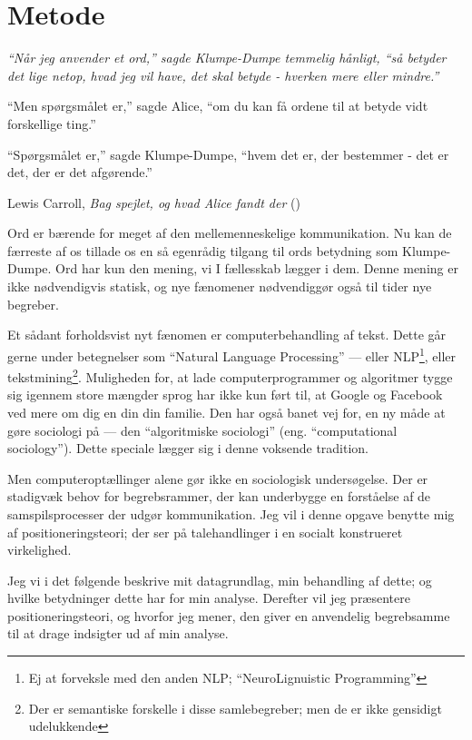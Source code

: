 \section{Metode}\label{sec:method}

\epigraph{\itshape
“Når jeg anvender et ord,” sagde Klumpe-Dumpe temmelig hånligt, “så betyder det lige netop, hvad jeg vil have, det skal betyde - hverken mere eller mindre.”

“Men spørgsmålet er,” sagde Alice, “om du kan få ordene til at betyde vidt forskellige ting.”

“Spørgsmålet er,” sagde Klumpe-Dumpe, “hvem det er, der bestemmer - det er det, der er det afgørende.”
}{Lewis Carroll, \textit{Bag spejlet, og hvad Alice fandt der} (\citeyear{carrollAliceEventyrlandOg1977})}

Ord er bærende for meget af den mellemenneskelige kommunikation.
Nu kan de færreste af os tillade os en så egenrådig tilgang til ords betydning som Klumpe-Dumpe.
Ord har kun den mening, vi I fællesskab lægger i dem.
Denne mening er ikke nødvendigvis statisk, og nye fænomener nødvendiggør også til tider nye begreber.

Et sådant forholdsvist nyt fænomen er computerbehandling af tekst.
Dette går gerne under betegnelser som “Natural Language Processing” — eller NLP\footnote{Ej at forveksle med den anden NLP; “NeuroLignuistic Programming”}, eller tekstmining\footnote{Der er semantiske forskelle i disse samlebegreber; men de er ikke gensidigt udelukkende}.
Muligheden for, at lade computerprogrammer og algoritmer tygge sig igennem store mængder sprog har ikke kun ført til, at Google og Facebook ved mere om dig en din din familie.
Den har også banet vej for, en ny måde at gøre sociologi på — den “algoritmiske sociologi” (eng. “computational sociology”).
Dette speciale lægger sig i denne voksende tradition.

Men computeroptællinger alene gør ikke en sociologisk undersøgelse.
Der er stadigvæk behov for begrebsrammer, der kan underbygge en forståelse af de samspilsprocesser der udgør kommunikation.
Jeg vil i denne opgave benytte mig af positioneringsteori; der ser på talehandlinger i en socialt konstrueret virkelighed.

Jeg vi i det følgende beskrive mit datagrundlag, min behandling af dette; og hvilke betydninger dette har for min analyse.
Derefter vil jeg præsentere positioneringsteori, og hvorfor jeg mener, den giver en anvendelig begrebsamme til at drage indsigter ud af min analyse.

